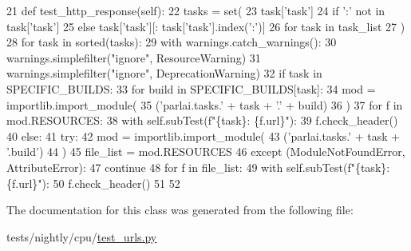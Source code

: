 \begin{DoxyCode}
21     \textcolor{keyword}{def }test\_http\_response(self):
22         tasks = set(
23             task[\textcolor{stringliteral}{'task'}]
24             \textcolor{keywordflow}{if} \textcolor{stringliteral}{':'} \textcolor{keywordflow}{not} \textcolor{keywordflow}{in} task[\textcolor{stringliteral}{'task'}]
25             \textcolor{keywordflow}{else} task[\textcolor{stringliteral}{'task'}][: task[\textcolor{stringliteral}{'task'}].index(\textcolor{stringliteral}{':'})]
26             \textcolor{keywordflow}{for} task \textcolor{keywordflow}{in} task\_list
27         )
28         \textcolor{keywordflow}{for} task \textcolor{keywordflow}{in} sorted(tasks):
29             with warnings.catch\_warnings():
30                 warnings.simplefilter(\textcolor{stringliteral}{"ignore"}, ResourceWarning)
31                 warnings.simplefilter(\textcolor{stringliteral}{"ignore"}, DeprecationWarning)
32                 \textcolor{keywordflow}{if} task \textcolor{keywordflow}{in} SPECIFIC\_BUILDS:
33                     \textcolor{keywordflow}{for} build \textcolor{keywordflow}{in} SPECIFIC\_BUILDS[task]:
34                         mod = importlib.import\_module(
35                             (\textcolor{stringliteral}{'parlai.tasks.'} + task + \textcolor{stringliteral}{'.'} + build)
36                         )
37                         \textcolor{keywordflow}{for} f \textcolor{keywordflow}{in} mod.RESOURCES:
38                             with self.subTest(f\textcolor{stringliteral}{"\{task\}: \{f.url\}"}):
39                                 f.check\_header()
40                 \textcolor{keywordflow}{else}:
41                     \textcolor{keywordflow}{try}:
42                         mod = importlib.import\_module(
43                             (\textcolor{stringliteral}{'parlai.tasks.'} + task + \textcolor{stringliteral}{'.build'})
44                         )
45                         file\_list = mod.RESOURCES
46                     \textcolor{keywordflow}{except} (ModuleNotFoundError, AttributeError):
47                         \textcolor{keywordflow}{continue}
48                     \textcolor{keywordflow}{for} f \textcolor{keywordflow}{in} file\_list:
49                         with self.subTest(f\textcolor{stringliteral}{"\{task\}: \{f.url\}"}):
50                             f.check\_header()
51 
52 
\end{DoxyCode}


The documentation for this class was generated from the following file\+:\begin{DoxyCompactItemize}
\item 
tests/nightly/cpu/\hyperlink{test__urls_8py}{test\+\_\+urls.\+py}\end{DoxyCompactItemize}
